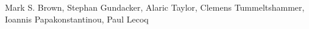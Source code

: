 Mark S. Brown, Stephan Gundacker, Alaric Taylor, Clemens Tummeltshammer, Ioannis Papakonstantinou, Paul Lecoq
 